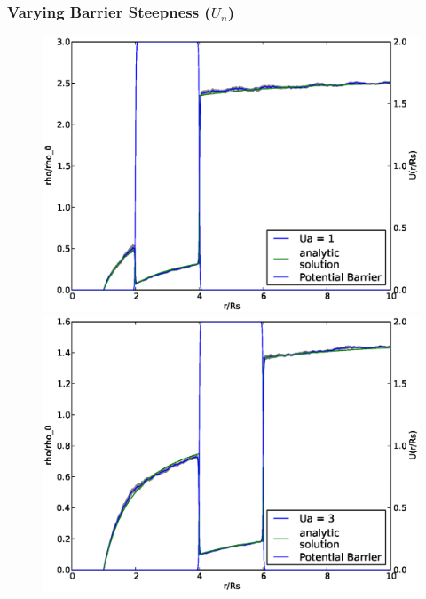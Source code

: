 \subsubsection{Varying Barrier Steepness ($U_n$)}
\begin{figure}[H]
\centering
\begin{minipage}{.5 \textwidth}
    \centering
    \includegraphics[width=.95 \textwidth, keepaspectratio]{plots/cp/un/Ua1.eps}
\end{minipage}\begin{minipage}{.5 \textwidth}
    \includegraphics[width=.95 \textwidth, keepaspectratio]{plots/cp/un/Ua3.eps}
\end{minipage}
\begin{minipage}{.5 \textwidth}

\end{minipage}
\end{figure}
